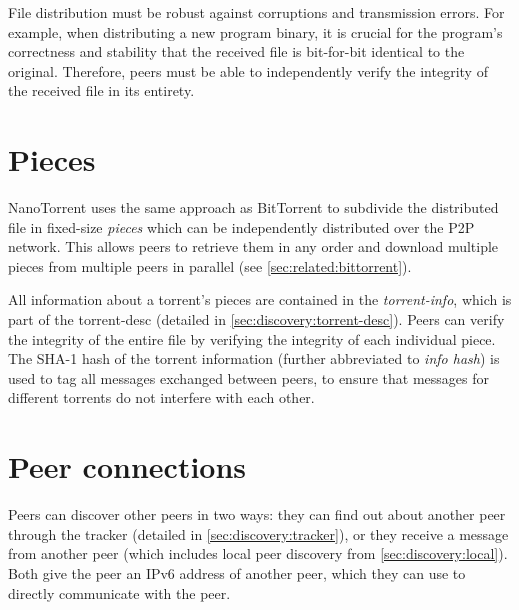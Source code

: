 File distribution must be robust against corruptions and transmission errors. For example, when distributing a new program binary, it is crucial for the program's correctness and stability that the received file is bit-for-bit identical to the original. Therefore, \glspl{peer} must be able to independently verify the integrity of the received file in its entirety.

\section{Pieces}
\label{sec:distrib:piece}
NanoTorrent uses the same approach as BitTorrent to subdivide the distributed file in fixed-size \emph{pieces} which can be independently distributed over the \gls{P2P} network. This allows peers to retrieve them in any order and download multiple pieces from multiple peers in parallel (see \ref{sec:related:bittorrent}).

All information about a torrent's pieces are contained in the \emph{\gls{torrent-info}}, which is part of the \gls{torrent-desc} (detailed in \ref{sec:discovery:torrent-desc}). Peers can verify the integrity of the entire file by verifying the integrity of each individual piece. The SHA-1 hash of the torrent information (further abbreviated to \emph{info hash}) is used to tag all messages exchanged between peers, to ensure that messages for different torrents do not interfere with each other.

\section{Peer connections}
\label{sec:distrib:connection}
Peers can discover other peers in two ways: they can find out about another peer through the tracker (detailed in \ref{sec:discovery:tracker}), or they receive a message from another peer (which includes local peer discovery  from \ref{sec:discovery:local}). Both give the peer an \gls{IPv6} address of another peer, which they can use to directly communicate with the peer.


